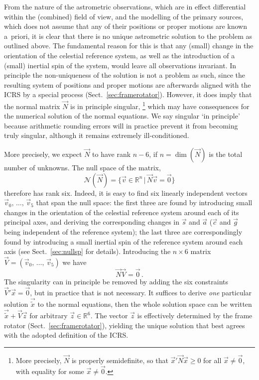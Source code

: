 \documentclass[structabstract]{aa}
\begin{document}
From the nature of the astrometric observations, which are in effect
differential within the (combined) field of view, and the modelling of
the primary sources, which does not assume that any of their positions
or proper motions are known a~priori, it is clear that there is no
unique astrometric solution to the problem as outlined above. The
fundamental reason for this is that any (small) change in the orientation
of the celestial reference system, as well as the introduction of a
(small) inertial spin of the system, would leave all observations
invariant. In principle the non-uniqueness of the solution is not a
problem as such, since the resulting system of positions and proper
motions are afterwards aligned with the ICRS by a special process
(Sect.~\ref{sec:framerotator}). However, it does imply that the
normal matrix $\vec{N}$ is in principle singular,%
\footnote{More precisely, $\vec{N}$ is properly semidefinite,
so that $\vec{x}'\vec{N}\vec{x}\ge 0$ for all $\vec{x}\ne\vec{0}$,
with equality for some $\vec{x}\ne\vec{0}$.\label{footnote1}}
which may have consequences for the numerical solution of the
normal equations. We say singular `in principle' because arithmetic
rounding errors will in practice prevent it from becoming truly
singular, although it remains extremely ill-conditioned.

More precisely, we expect $\vec{N}$ to have rank $n-6$, if
$n=\dim(\vec{N})$ is the total number of unknowns. The null space
of the matrix,
\begin{equation}\label{eq:null}
\mathcal{N}(\vec{N}) = \{ \vec{v}\in\mathbb{R}^n\,|\,\vec{N}\vec{v}=\vec{0}\}
\end{equation}
therefore has rank six. Indeed, it is easy to find six linearly
independent vectors $\vec{v}_0,\,\dots,\,\vec{v}_5$ that span the null space:
the first three are found by introducing small changes in the orientation
of the celestial reference system around each of its principal axes,
and deriving the corresponding changes in $\vec{s}$ and $\vec{a}$
($\vec{c}$ and $\vec{g}$ being independent of the reference system);
the last three are correspondingly found by introducing a small
inertial spin of the reference system around each axis (see
Sect.~\ref{sec:nullsp} for details). Introducing
the $n\times 6$ matrix $\vec{V}=(\vec{v}_0,\,\dots,\,\vec{v}_5)$ we have
\begin{equation}\label{eq:nullV}
\vec{N}\vec{V} = \vec{0}\, .
\end{equation}
The singularity can in principle be removed by adding the six constraints
$\vec{V}'\vec{x}=\vec{0}$, but in practice that is not necessary. It suffices
to derive \emph{one} particular solution $\vec{\tilde{x}}$ to the normal
equations, then the whole solution space can be written
$\vec{\tilde{x}}+\vec{V}\vec{z}$ for arbitrary $\vec{z}\in\mathbb{R}^6$.
The vector $\vec{z}$ is effectively determined by the frame rotator
(Sect.~\ref{sec:framerotator}), yielding the unique solution
that best agrees with the adopted definition of the ICRS.
\end{document}
